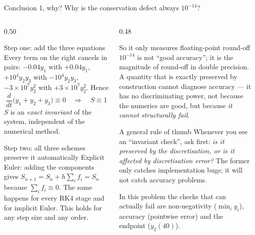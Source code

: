 \documentclass[aspectratio=169,10pt]{beamer}
\begin{document}
\begin{frame}{Conclusion 1, why?  Why is the conservation defect always $10^{-14}$?}
  \begin{columns}[T]
    \begin{column}{0.50\textwidth}
      \begin{block}{Step one: add the three equations}
        \footnotesize
        Every term on the right cancels in pairs:
        $-0.04y_1$ with $+0.04y_1$,
        $+10^{4}y_2y_3$ with $-10^{4}y_2y_3$,
        $-3\times10^{7}y_2^{2}$ with $+3\times10^{7}y_2^{2}$.  Hence
        \[
          \frac{d}{dt}\bigl(y_1+y_2+y_3\bigr)\equiv0
          \quad\Longrightarrow\quad S\equiv1
        \]
        $S$ is an \emph{exact invariant} of the system, independent of the
        numerical method.
      \end{block}
      \begin{block}{Step two: all three schemes preserve it automatically}
        \footnotesize
        Explicit Euler: adding the components gives
        $S_{n+1}=S_n+h\sum_i f_i=S_n$ because $\sum_i f_i\equiv0$.  The same
        happens for every RK4 stage and for implicit Euler.  \alert{This holds
        for any step size and any order.}
      \end{block}
    \end{column}
    \begin{column}{0.48\textwidth}
      \begin{alertblock}{So it only measures floating-point round-off}
        \footnotesize
        $10^{-14}$ is not ``good accuracy''; it is the magnitude of
        round-off in double precision.  A quantity that is \alert{exactly
        preserved by construction} cannot diagnose accuracy --- it has no
        discriminating power, not because the numerics are good, but because
        \emph{it cannot structurally fail}.
      \end{alertblock}
      \begin{block}{A general rule of thumb}
        \footnotesize
        Whenever you see an ``invariant check'', ask first:
        \emph{is it preserved by the discretisation, or is it affected by
        discretisation error?}  The former only catches implementation bugs;
        it will not catch accuracy problems.
      \end{block}
      \vspace{0.1em}
      \footnotesize
      In this problem the checks that can actually fail are non-negativity
      ($\min_i y_i$), accuracy (pointwise error) and the endpoint ($y_2(40)$).
    \end{column}
  \end{columns}
\end{frame}
\end{document}
